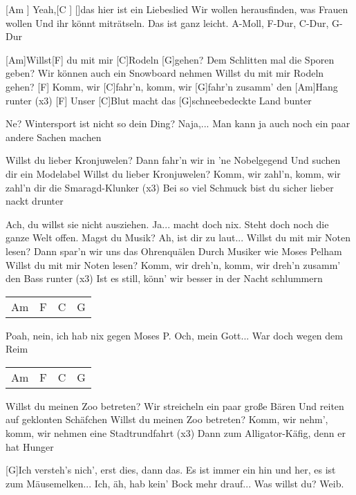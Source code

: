 



\begin{guitar}
	[Am ] Yeah,[C ] []das hier ist ein Liebeslied
	Wir wollen herausfinden, was Frauen wollen
	Und ihr könnt miträtseln. Das ist ganz leicht.
	A-Moll, F-Dur, C-Dur, G-Dur
	
	[Am]Willst[F] du mit mir [C]Rodeln [G]gehen?
	Dem Schlitten mal die Sporen geben?
	Wir können auch ein Snowboard nehmen
	Willst du mit mir Rodeln gehen?
	[F] Komm, wir [C]fahr'n, komm, wir [G]fahr'n zusamm' den [Am]Hang runter (x3)
	[F] Unser [C]Blut macht das [G]schneebedeckte Land bunter
	
	Ne? Wintersport ist nicht so dein Ding? Naja,... 
	Man kann ja auch noch ein paar andere Sachen machen
	
	Willst du lieber Kronjuwelen?
	Dann fahr'n wir in 'ne Nobelgegend
	Und suchen dir ein Modelabel
	Willst du lieber Kronjuwelen?
	Komm, wir zahl'n, komm, wir zahl'n dir die Smaragd-Klunker (x3)
	Bei so viel Schmuck bist du sicher lieber nackt drunter
	
	Ach, du willst sie nicht ausziehen. Ja... macht doch nix. Steht doch noch 
	die ganze Welt offen. Magst du Musik? Ah, ist dir zu laut...
	\pagebreak
	Willst du mit mir Noten lesen?
	Dann spar'n wir uns das Ohrenquälen
	Durch Musiker wie Moses Pelham
	Willst du mit mir Noten lesen?
	Komm, wir dreh'n, komm, wir dreh'n zusamm' den Bass runter (x3)
	Ist es still, könn' wir besser in der Nacht schlummern
	
	{\footnotesize\begin{tabular}{l|l|l|l}
			Am & F & C & G
	\end{tabular}}
	Poah, nein, ich hab nix gegen Moses P. 
	Och, mein Gott... War doch wegen dem Reim
	{\footnotesize\begin{tabular}{l|l|l|l}
			Am & F & C & G
	\end{tabular}}
	
	Willst du meinen Zoo betreten?
	Wir streicheln ein paar große Bären
	Und reiten auf geklonten Schäfchen
	Willst du meinen Zoo betreten?
	Komm, wir nehm', komm, wir nehmen eine Stadtrundfahrt (x3)
	Dann zum Alligator-Käfig, denn er hat Hunger
	
	[G]Ich versteh's nich', erst dies, dann das. Es ist immer ein hin und her, es ist 
	zum Mäusemelken... Ich, äh, hab kein' Bock mehr drauf... Was willst du? 
	Weib.
\end{guitar}